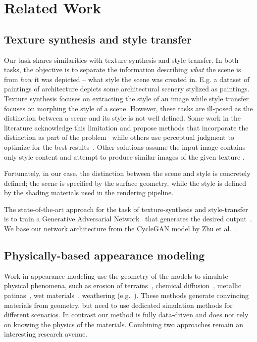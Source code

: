 \chapter{Related Work}

\section{Texture synthesis and style transfer}

Our task shares similarities with texture synthesis and style transfer. In both tasks, the
objective is to separate the information describing \emph{what} the scene is from \emph{how}
it was depicted -- what style the scene was created in. E.g. a dataset of paintings of
architecture depicts some architectural scenery stylized as paintings. Texture synthesis
focuses on extracting the style of an image while style transfer focuses on morphing the
style of a scene. However, these tasks are ill-posed as the distinction between a scene and
its style is not well defined. Some work in the literature acknowledge this limitation and
propose methods that incorporate the distinction as part of the
problem~\cite{isola2017image, zhu2017unpaired} while others use perceptual judgment to
optimize for the best
results~\cite{gatys2015texture, gatys2016image, ulyanov2016texture, johnson2016perceptual}.
Other solutions assume the input image contains only style content and attempt to produce
similar images of the given texture \cite{wei2009sae, sendik2017deep, zhou2018non}. 

Fortunately, in our case, the distinction between the scene and style is concretely defined;
the scene is specified by the surface geometry, while the style is defined by the shading
materials used in the rendering pipeline.

The state-of-the-art approach for the task of texture-synthesis and style-transfer is to
train a Generative Adversarial Network~\cite{goodfellow2014generative} that generates the
desired output~\cite{johnson2016perceptual, isola2017image, zhu2017unpaired, zhou2018non}.
We base our network architecture from the CycleGAN model by Zhu et al.~\cite{zhu2017unpaired}.

\section{Physically-based appearance modeling}

Work in appearance modeling use the geometry of the models to simulate physical phenomena, such
as erosion of terrains~\cite{musgrave1989eroded}, chemical diffusion~\cite{turk1991diffusion},
metallic patinas~\cite{dorsey1996patinas}, wet materials~\cite{jensen1999wet}, weathering
(e.g.~\cite{dorsey1999weather, chen2005weathering, bosch2011weathering}). These methods
generate convincing materials from geometry, but need to use dedicated simulation methods for
different scenarios. In contrast our method is fully data-driven and does not rely on knowing
the physics of the materials. Combining two approaches remain an interesting research avenue.

